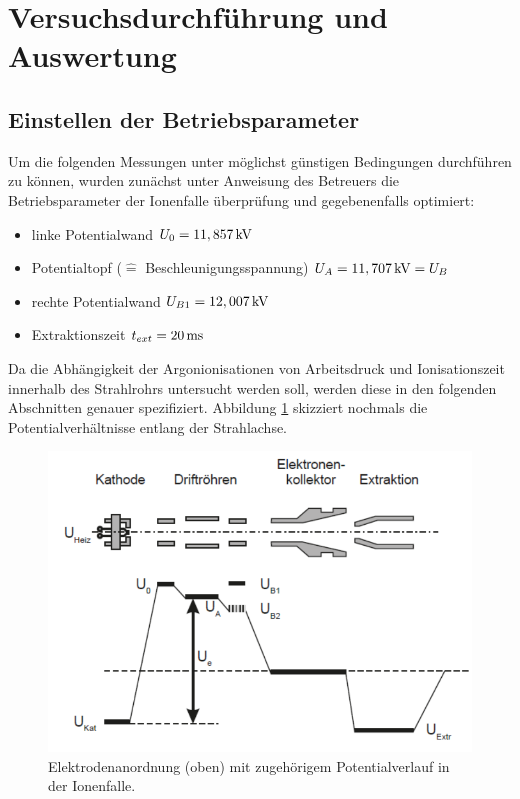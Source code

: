 \section{Versuchsdurchführung und Auswertung}
	\subsection{Einstellen der Betriebsparameter}
		Um die folgenden Messungen unter möglichst günstigen Bedingungen durchführen zu können, wurden zunächst unter Anweisung des Betreuers die Betriebsparameter der Ionenfalle überprüfung und gegebenenfalls optimiert:
		\begin{itemize}
			\item linke Potentialwand $U_0 = \unit[11,857]{kV}$
			\item Potentialtopf ($\hat{=}$ Beschleunigungsspannung) $U_A = \unit[11,707]{kV}=U_B$
			\item rechte Potentialwand $U_{B1} = \unit[12,007]{kV}$
			\item Extraktionszeit $t_{ext} = \unit[20]{ms}$
		\end{itemize}
		Da die Abhängigkeit der Argonionisationen von Arbeitsdruck und Ionisationszeit innerhalb des Strahlrohrs untersucht werden soll, werden diese in den folgenden Abschnitten genauer spezifiziert. Abbildung \ref{fig:potentialkasten} skizziert nochmals die Potentialverhältnisse entlang der Strahlachse.
		\begin{figure}[htb]
			\centering
			\includegraphics[width=0.8\linewidth]{pic/potentialkasten}
			\caption{Elektrodenanordnung (oben) mit zugehörigem Potentialverlauf in der Ionenfalle.\cite{PA}}
			\label{fig:potentialkasten}
		\end{figure}
		
